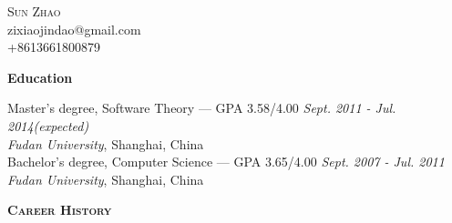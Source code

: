 \documentclass[9pt]{article}
\newenvironment{changemargin}[2]{%
  \begin{list}{}{%
    \setlength{\topsep}{0pt}%
    \setlength{\leftmargin}{#1}%
    \setlength{\rightmargin}{#2}%
    \setlength{\listparindent}{\parindent}%
    \setlength{\itemindent}{\parindent}%
    \setlength{\parsep}{\parskip}%
  }%
  \item[]}{\end{list}
}
\newcommand{\lineover}{
	\begin{changemargin}{-0.05in}{-0.05in}
		\vspace*{-8pt}
		\hrulefill \\
		\vspace*{-2pt}
	\end{changemargin}
}
\newcommand{\header}[1]{
	\begin{changemargin}{-0.5in}{-0.5in}
		\scshape{#1}\\
  	\lineover
	\end{changemargin}
}
\newcommand{\contact}[4]{
	\begin{changemargin}{-0.5in}{-0.5in}
		\begin{center}
			{\Large \scshape {#1}}\\ \smallskip
			{#2}\\ \smallskip
			{#3}\\ \smallskip
			{#4}\smallskip
		\end{center}
	\end{changemargin}
}
\newenvironment{body} {
	\vspace*{-16pt}
	\begin{changemargin}{-0.25in}{-0.5in}
  }	
	{\end{changemargin}
}
\begin{document}
\thispagestyle{empty}
\contact{Sun Zhao}{zixiaojindao@gmail.com}{+8613661800879}


%
%


\header{\textbf{Education}}

\begin{body}
	\vspace{14pt}
	Master's degree, Software Theory --- GPA 3.58/4.00 \hfill \emph{Sept. 2011 - Jul. 2014(expected)} \\
	\emph{Fudan University}, Shanghai, China \\
  \medskip
	Bachelor's degree, Computer Science --- GPA 3.65/4.00 \hfill \emph{Sept. 2007 - Jul. 2011} \\
	\emph{Fudan University}, Shanghai, China\\
\end{body}

\smallskip


\header{\textbf{Career History}}
\end{document}
